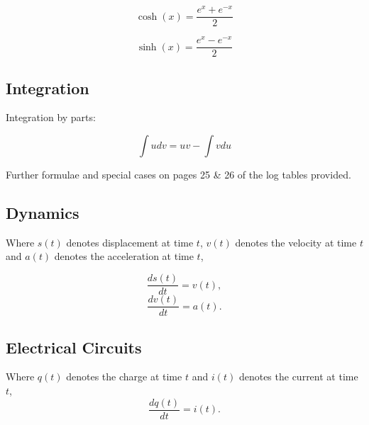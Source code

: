 ﻿ \documentclass[a4paper,12pt]{article}
\begin{document}
	\begin{multicols}{2}
	\[ \cosh(x)  =  \frac{e^{x} + e^{-x}}{2} \]
	
	\[ \sinh(x)  = \frac{e^{x} - e^{-x}}{2} \]
	\end{multicols}

	
	

	\subsection*{Integration}
	
	Integration by parts: 
	
	\[ \int u dv = uv - \int v du \]  
	
\noindent Further formulae and special cases on pages 25 \& 26 of the log tables provided.
	
	\subsection*{Dynamics}
	Where $s(t)$ denotes displacement at time $t$, $v(t)$ denotes the velocity at time $t$ and $a(t)$
	denotes the acceleration at time $t$, 
	\begin{multicols}{2}
	\[  \frac{ds(t)}{dt}  = v(t),\]
	\[  \frac{dv(t)}{dt}  = a(t).\]
	\end{multicols}
	\subsection*{Electrical Circuits}
	Where $q(t)$ denotes the charge at time $t$ and $i(t)$ denotes the current at time $t$,
	\[  \frac{dq(t)}{dt}  = i(t).\]
	
	
\end{document}
